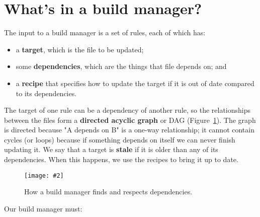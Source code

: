 \documentclass[krantzl]{krantz}
\newcommand{\figpdf}[4]{\begin{figure}%
\centering%
\texttt{[image: \#2]}%
\caption{#3}%
\label{#1}%
\end{figure}}
\newcommand{\figref}[1]{Figure~\ref{#1}}
\newcommand{\glossref}[1]{\textbf{#1}}
\begin{document}
\section{What's in a build manager?}\label{build-manager-contents}


The input to a build manager is a set of rules,
each of which has:

\begin{itemize}

\item 

a \glossref{target}, which is the file to be updated;



\item 

some \glossref{dependencies}, which are the things that file depends on;
    and



\item 

a \glossref{recipe} that specifies how to update the target
    if it is out of date compared to its dependencies.



\end{itemize}


The target of one rule can be a dependency of another rule,
so the relationships between the files form a \glossref{directed acyclic graph} or DAG
(\figref{build-manager-dependencies}).
The graph is directed because "A depends on B" is a one-way relationship;
it cannot contain cycles (or loops) because
if something depends on itself we can never finish updating it.
We say that a target is \glossref{stale} if it is older than any of its dependencies.
When this happens,
we use the recipes to bring it up to date.

\figpdf{build-manager-dependencies}{./build-manager/dependencies.pdf}{How a build manager finds and respects dependencies.}{0.6}


Our build manager must:
\end{document}
